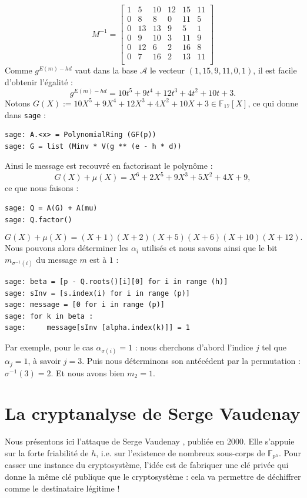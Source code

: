 \documentclass[a4paper, titlepage, 11pt]{article}
\theoremstyle{definition}
\theoremstyle{remark}
\def\gf #1{\mathbb{F}_{#1}}
\begin{document}
$$M^{-1} = \left[\begin{array}{cccccc}
1 & 5 & 10 & 12 & 15 & 11 \\
0 & 8 & 8 & 0 & 11 & 5 \\
0 & 13 & 13 & 9 & 5 & 1 \\
0 & 9 & 10 & 3 & 11 & 9 \\
0 & 12 & 6 & 2 & 16 & 8 \\
0 & 7 & 16 & 2 & 13 & 11 \\
\end{array}\right]$$
Comme $g^{E(m) - hd}$ vaut dans la base $\mathcal{A}$ le vecteur $(1, 15, 9, 11, 0, 1)$, il est facile d'obtenir l'égalité :
$$g^{E(m) - hd} = 10t^5 + 9t^4 + 12t^3 + 4t^2 + 10t + 3.$$
Notons $G(X) := 10X^5 + 9X^4 + 12X^3 + 4X^2 + 10X + 3 \in \gf{17}[X]$, ce qui donne dans \verb|sage| :
\begin{verbatim}
sage: A.<x> = PolynomialRing (GF(p))
sage: G = list (Minv * V(g ** (e - h * d))
\end{verbatim}
Ainsi le message est recouvré en factorisant le polynôme :
$$G(X) + \mu(X) = X^6 + 2X^5 + 9X^3 + 5X^2 + 4X + 9,$$
ce que nous faisons :
\begin{verbatim}
sage: Q = A(G) + A(mu)
sage: Q.factor()
\end{verbatim}
$$G(X) + \mu(X) = (X + 1)(X + 2)(X + 5)(X + 6)(X + 10)(X + 12).$$
Nous pouvons alors déterminer les $\alpha_i$ utilisés et nous savons ainsi que le bit $m_{\sigma^{-1}(i)}$ du message $m$ est à $1$ :
\begin{verbatim}
sage: beta = [p - Q.roots()[i][0] for i in range (h)]
sage: sInv = [s.index(i) for i in range (p)]
sage: message = [0 for i in range (p)]
sage: for k in beta :
sage:     message[sInv [alpha.index(k)]] = 1
\end{verbatim}
Par exemple, pour le cas $\alpha_{\sigma(i)} = 1$ : nous cherchons d'abord l'indice $j$ tel que $\alpha_j = 1$, à savoir $j = 3$. Puis nous déterminons son antécédent par la permutation : $\sigma^{-1}(3) = 2$. Et nous avons bien $m_2 = 1$.

\section{La cryptanalyse de Serge Vaudenay}\label{sec:cryptanalyse}

Nous présentons ici l'attaque de Serge Vaudenay \cite{vaudenay2000}, publiée en 2000. Elle s'appuie sur la forte friabilité de $h$, i.e. sur l'existence de nombreux sous-corps de $\gf{p^h}$. Pour casser une instance du cryptosystème, l'idée est de fabriquer une clé privée qui donne la même clé publique que le cryptosystème : cela va permettre de déchiffrer comme le destinataire légitime !
\end{document}
